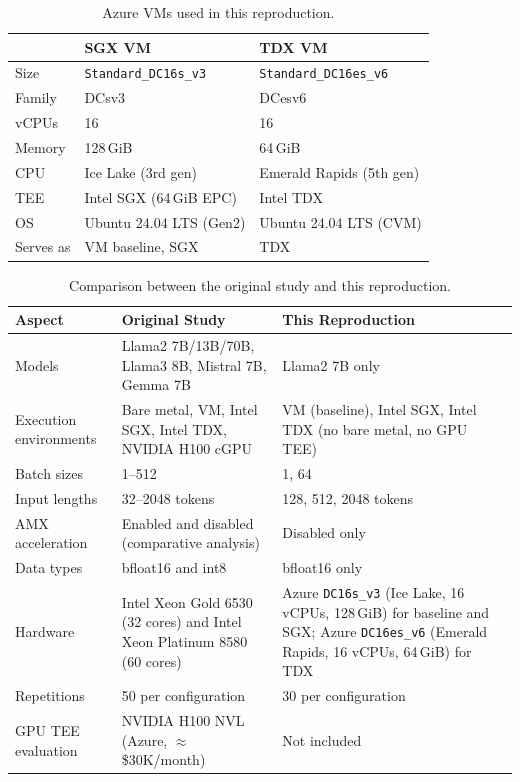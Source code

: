 \documentclass[sigconf]{acmart}
\begin{document}
\begin{table}[t]
  \caption{Azure VMs used in this reproduction.}
  \label{tab:vms}
  \small
  \begin{tabular}{lll}
    \toprule
              & \textbf{SGX VM} & \textbf{TDX VM} \\
    \midrule
    Size      & \texttt{Standard\_DC16s\_v3} & \texttt{Standard\_DC16es\_v6} \\
    Family    & DCsv3 & DCesv6 \\
    vCPUs     & 16 & 16 \\
    Memory    & 128\,GiB & 64\,GiB \\
    CPU       & Ice Lake (3rd gen) & Emerald Rapids (5th gen) \\
    TEE       & Intel SGX (64\,GiB EPC) & Intel TDX \\
    OS        & Ubuntu 24.04 LTS (Gen2) & Ubuntu 24.04 LTS (CVM) \\
    Serves as & VM baseline, SGX & TDX \\
    \bottomrule
  \end{tabular}
\end{table}

\begin{table}[!b]
  \caption{Comparison between the original study and this reproduction.}
  \label{tab:differences}
  \small
  \begin{tabular}{p{3.2cm} p{6cm} p{6cm}}
    \toprule
    \textbf{Aspect} & \textbf{Original Study} & \textbf{This Reproduction} \\
    \midrule
    Models & Llama2 7B/13B/70B, Llama3 8B, Mistral 7B, Gemma 7B & Llama2 7B only \\
    \midrule
    Execution environments & Bare metal, VM, Intel SGX, Intel TDX, NVIDIA H100 cGPU &
                             VM (baseline), Intel SGX, Intel TDX (no bare metal, no GPU TEE) \\
    \midrule
    Batch sizes & 1--512 & 1, 64 \\
    \midrule
    Input lengths & 32--2048 tokens & 128, 512, 2048 tokens \\
    \midrule
    AMX acceleration & Enabled and disabled (comparative analysis) & Disabled only \\
    \midrule
    Data types & bfloat16 and int8 & bfloat16 only \\
    \midrule
    Hardware & Intel Xeon Gold 6530 (32 cores) and Intel Xeon Platinum 8580 (60 cores) &
               Azure \texttt{DC16s\_v3} (Ice Lake, 16 vCPUs, 128\,GiB) for baseline and SGX;
               Azure \texttt{DC16es\_v6} (Emerald Rapids, 16 vCPUs, 64\,GiB) for TDX \\
    \midrule
    Repetitions & 50 per configuration & 30 per configuration \\
    \midrule
    GPU TEE evaluation & NVIDIA H100 NVL (Azure, $\approx$\$30K/month) & Not included \\
    \bottomrule
  \end{tabular}
\end{table}
\end{document}
